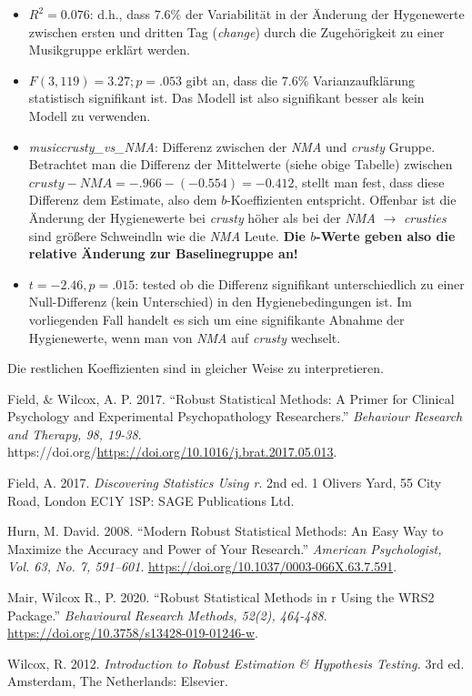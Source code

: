\documentclass[
]{article}
\providecommand{\tightlist}{%
  \setlength{\itemsep}{0pt}\setlength{\parskip}{0pt}}
\newlength{\cslhangindent}
\newenvironment{CSLReferences}[2] %
 {\begin{list}{}{%
  \setlength{\itemindent}{0pt}
  \setlength{\leftmargin}{0pt}
  \setlength{\parsep}{0pt}
  \ifodd #1
   \setlength{\leftmargin}{\cslhangindent}
   \setlength{\itemindent}{-1\cslhangindent}
  \fi
  \setlength{\itemsep}{#2\baselineskip}}}
 {\end{list}}
\begin{document}
\begin{itemize}
\tightlist
\item
  \(R^2 = 0.076\): d.h., dass \(7.6\%\) der Variabilität in der Änderung der Hygenewerte zwischen ersten und dritten Tag (\emph{change}) durch die Zugehörigkeit zu einer Musikgruppe erklärt werden.
\item
  \(F(3, 119) = 3.27; p = .053\) gibt an, dass die \(7.6\%\) Varianzaufklärung statistisch signifikant ist. Das Modell ist also signifikant besser als kein Modell zu verwenden.
\item
  \emph{musiccrusty\_vs\_NMA}: Differenz zwischen der \emph{NMA} und \emph{crusty} Gruppe. Betrachtet man die Differenz der Mittelwerte (siehe obige Tabelle) zwischen \(crusty - NMA = -.966 - (-0.554) = -0.412\), stellt man fest, dass diese Differenz dem Estimate, also dem \(b\)-Koeffizienten entspricht. Offenbar ist die Änderung der Hygienewerte bei \emph{crusty} höher als bei der \emph{NMA} \(\rightarrow\) \emph{crusties} sind größere Schweindln wie die \emph{NMA} Leute. \textbf{Die \(b\)-Werte geben also die relative Änderung zur Baselinegruppe an!}
\item
  \(t = -2.46, p = .015\): tested ob die Differenz signifikant unterschiedlich zu einer Null-Differenz (kein Unterschied) in den Hygienebedingungen ist. Im vorliegenden Fall handelt es sich um eine signifikante Abnahme der Hygienewerte, wenn man von \emph{NMA} auf \emph{crusty} wechselt.
\end{itemize}

Die restlichen Koeffizienten sind in gleicher Weise zu interpretieren.

\label{refs}
\begin{CSLReferences}{1}{0}
Field, \& Wilcox, A. P. 2017. {``Robust Statistical Methods: A Primer for Clinical Psychology and Experimental Psychopathology Researchers.''} \emph{Behaviour Research and Therapy, 98, 19-38}. https://doi.org/\url{https://doi.org/10.1016/j.brat.2017.05.013}.

Field, A. 2017. \emph{Discovering Statistics Using r}. 2nd ed. 1 Olivers Yard, 55 City Road, London EC1Y 1SP: {SAGE Publications Ltd}.

Hurn, M. David. 2008. {``Modern Robust Statistical Methods: An Easy Way to Maximize the Accuracy and Power of Your Research.''} \emph{American Psychologist, Vol. 63, No. 7, 591--601}. \url{https://doi.org/10.1037/0003-066X.63.7.591}.

Mair, Wilcox R., P. 2020. {``Robust Statistical Methods in r Using the WRS2 Package.''} \emph{Behavioural Research Methods, 52(2), 464-488}. \url{https://doi.org/10.3758/s13428-019-01246-w}.

Wilcox, R. 2012. \emph{Introduction to Robust Estimation \& Hypothesis Testing.} 3rd ed. Amsterdam, The Netherlands: {Elsevier}.

\end{CSLReferences}
\end{document}

